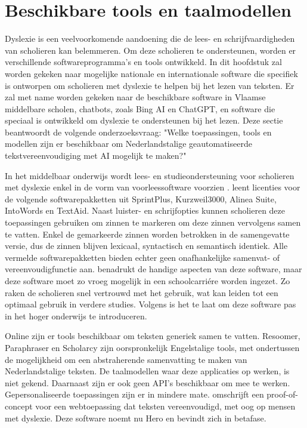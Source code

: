 \section{Beschikbare tools en taalmodellen}

Dyslexie is een veelvoorkomende aandoening die de lees- en schrijfvaardigheden van scholieren kan belemmeren. Om deze scholieren te ondersteunen, worden er verschillende softwareprogramma's en tools ontwikkeld. In dit hoofdstuk zal worden gekeken naar mogelijke nationale en internationale software die specifiek is ontworpen om scholieren met dyslexie te helpen bij het lezen van teksten. Er zal met name worden gekeken naar de beschikbare software in Vlaamse middelbare scholen, chatbots, zoals Bing AI en ChatGPT, en software die speciaal is ontwikkeld om dyslexie te ondersteunen bij het lezen. Deze sectie beantwoordt de volgende onderzoeksvraag: "Welke toepassingen, tools en modellen zijn er beschikbaar om Nederlandstalige geautomatiseerde tekstvereenvoudiging met AI mogelijk te maken?"

\medspace

In het middelbaar onderwijs wordt lees- en studieondersteuning voor scholieren met dyslexie enkel in de vorm van voorleessoftware voorzien \autocite{DeCraemer2018, OnderwijsVlaanderen2023}. \textcite{OnderwijsVlaanderen2023} leent licenties voor de volgende softwarepakketten uit SprintPlus, Kurzweil3000, Alinea Suite, IntoWords en TextAid. Naast luister- en schrijfopties kunnen scholieren deze toepassingen gebruiken om zinnen te markeren om deze zinnen vervolgens samen te vatten. Enkel de gemarkeerde zinnen worden betrokken in de samengevatte versie, dus de zinnen blijven lexicaal, syntactisch en semantisch identiek. Alle vermelde softwarepakketten bieden echter geen onafhankelijke samenvat- of vereenvoudigfunctie aan. \textcite{Tops2018} benadrukt de handige aspecten van deze software, maar deze software moet zo vroeg mogelijk in een schoolcarriére worden ingezet. Zo raken de scholieren snel vertrouwd met het gebruik, wat kan leiden tot een optimaal gebruik in verdere studies. Volgens \textcite{Tops2018} is het te laat om deze software pas in het hoger onderwijs te introduceren.

\medspace

Online zijn er tools beschikbaar om teksten generiek samen te vatten. Resoomer, Paraphraser en Scholarcy zijn oorspronkelijk Engelstalige tools, met ondertussen de mogelijkheid om een abstraherende samenvatting te maken van Nederlandstalige teksten. De taalmodellen waar deze applicaties op werken, is niet gekend. Daarnaast zijn er ook geen API's beschikbaar om mee te werken. Gepersonaliseerde toepassingen zijn er in mindere mate. \textcite{Bingel2018} omschrijft een proof-of-concept voor een webtoepassing dat teksten vereenvoudigd, met oog op mensen met dyslexie. Deze software noemt nu Hero en bevindt zich in betafase.


